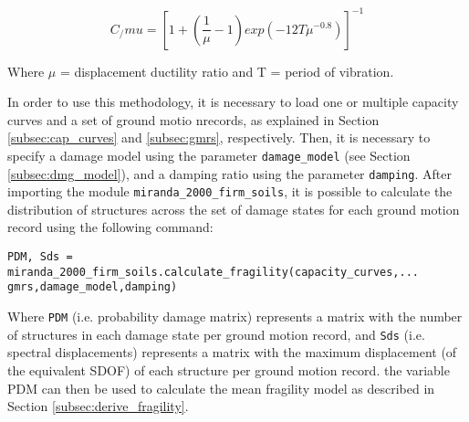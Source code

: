 \begin{equation}
C_/mu = \left[1+\left(\frac{1}{\mu}-1\right)exp\left(-12T\mu^{-0.8}\right)\right]^{-1}
\end{equation} 

Where $\mu$ = displacement ductility ratio and T = period of vibration.

In order to use this methodology, it is necessary to load one or multiple capacity curves and a set of ground motio nrecords, as explained in Section \ref{subsec:cap_curves} and \ref{subsec:gmrs}, respectively. Then, it is necessary to specify a damage model using the parameter \verb=damage_model= (see Section \ref{subsec:dmg_model}), and a damping ratio using the parameter \verb=damping=. After importing the module \verb=miranda_2000_firm_soils=, it is possible to calculate the distribution of structures across the set of damage states for each ground motion record using the following command:

\begin{Verbatim}[frame=single, commandchars=\\\{\}, samepage=true]
PDM, Sds = miranda_2000_firm_soils.calculate_fragility(capacity_curves,...
gmrs,damage_model,damping)
\end{Verbatim}

Where \verb=PDM= (i.e. probability damage matrix) represents a matrix with the number of structures in each damage state per ground motion record, and \verb=Sds= (i.e. spectral displacements) represents a matrix with the maximum displacement (of the equivalent SDOF) of each structure per ground motion record. the variable PDM can then be used to calculate the mean fragility model as described in Section \ref{subsec:derive_fragility}.



